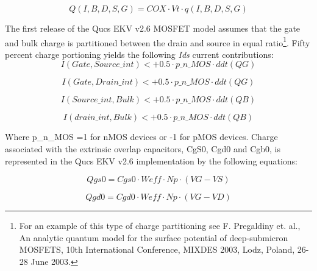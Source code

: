 \hspace{20mm}     \begin{equation}
			Q(I,B,D,S,G) = COX \cdot Vt \cdot q(I,B,D,S,G)
                  \end{equation}  

The first release of the Qucs EKV v2.6 MOSFET model assumes that the
gate and bulk charge is partitioned between the drain and source in
equal ratio\footnote{For an example of this type of charge
partitioning see F. Pregaldiny et. al., An analytic quantum model for
the surface potential of deep-submicron MOSFETS, 10th International
Conference, MIXDES 2003, Lodz, Poland, 26-28 June 2003.}. Fifty
percent charge portioning yields the following \textit{Ids} current
contributions:
\hspace{20mm}     \begin{equation} 
			I(Gate, Source\_int) <+ 0.5 \cdot p\_n\_MOS \cdot ddt(QG)
                  \end{equation}  

\hspace{20mm}     \begin{equation}
			I(Gate, Drain\_int) <+ 0.5 \cdot p\_n\_MOS \cdot ddt(QG)
                  \end{equation}  

\hspace{20mm}     \begin{equation}
			I(Source\_int, Bulk) <+ 0.5 \cdot p\_n\_MOS \cdot ddt(QB)
                  \end{equation} 

\hspace{20mm}     \begin{equation}
			I(drain\_int, Bulk) <+ 0.5 \cdot p\_n\_MOS \cdot ddt(QB)
                  \end{equation}  


\vspace{8mm}
Where p\_n\_MOS =1 for nMOS devices or -1 for pMOS devices. Charge
associated with the extrinsic overlap capacitors, CgS0, Cgd0 and Cgb0,
is represented in the Qucs EKV v2.6 implementation by the following
equations:

\hspace{20mm}     \begin{equation} 
			Qgs0 = Cgs0 \cdot Weff \cdot Np \cdot (VG - VS)
                  \end{equation}  

\hspace{20mm}     \begin{equation} 
			Qgd0 = Cgd0 \cdot Weff \cdot Np \cdot (VG - VD)
                  \end{equation}  

